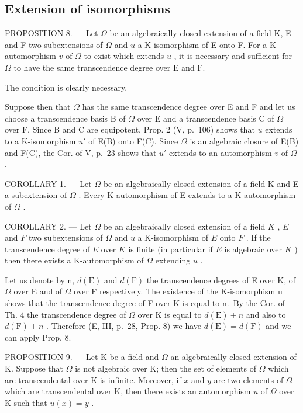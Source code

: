\subsection{Extension of isomorphisms}

PROPOSITION 8. --- Let \(\Omega\) be an algebraically closed extension of a field K, E and F two subextensions of \(\Omega\) and \(u\) a K-isomorphism of E onto F. For a K-automorphism \(v\) of \(\Omega\) to exist which extends \(u\) , it is necessary and sufficient for \(\Omega\) to have the same transcendence degree over E and F.

The condition is clearly necessary.

Suppose then that \(\Omega\) has the same transcendence degree over E and F and let us choose a transcendence basis B of \(\Omega\) over E and a transcendence basis C of \(\Omega\) over F. Since B and C are equipotent, Prop. 2 (V, p.~106) shows that \(u\) extends to a K-isomorphism \(u'\) of E(B) onto F(C). Since \(\Omega\) is an algebraic closure of E(B) and F(C), the Cor. of V, p.~23 shows that \(u'\) extends to an automorphism \(v\) of \(\Omega\) .

COROLLARY 1. --- Let \(\Omega\) be an algebraically closed extension of a field K and E a subextension of \(\Omega\) . Every K-automorphism of E extends to a K-automorphism of \(\Omega\) .

COROLLARY 2. --- Let \(\Omega\) be an algebraically closed extension of a field \(K\) , \(E\) and \(F\) two subextensions of \(\Omega\) and \(u\) a K-isomorphism of \(E\) onto \(F\) . If the transcendence degree of \(E\) over \(K\) is finite (in particular if \(E\) is algebraic over \(K\) ) then there exists a K-automorphism of \(\Omega\) extending \(u\) .

Let us denote by n, \(d(\mathrm{E})\) and \(d(\mathrm{F})\) the transcendence degrees of E over K, of \(\Omega\) over E and of \(\Omega\) over F respectively. The existence of the K-isomorphism u shows that the transcendence degree of F over K is equal to n.~By the Cor. of Th. 4 the transcendence degree of \(\Omega\) over K is equal to \(d(\mathrm{E}) + n\) and also to \(d(\mathrm{F}) + n\) . Therefore (E, III, p.~28, Prop. 8) we have \(d(\mathrm{E}) = d(\mathrm{F})\) and we can apply Prop. 8.

PROPOSITION 9. --- Let K be a field and \(\Omega\) an algebraically closed extension of K. Suppose that \(\Omega\) is not algebraic over K; then the set of elements of \(\Omega\) which are transcendental over K is infinite. Moreover, if \(x\) and \(y\) are two elements of \(\Omega\) which are transcendental over K, then there exists an automorphism \(u\) of \(\Omega\) over K such that \(u(x) = y\) .

